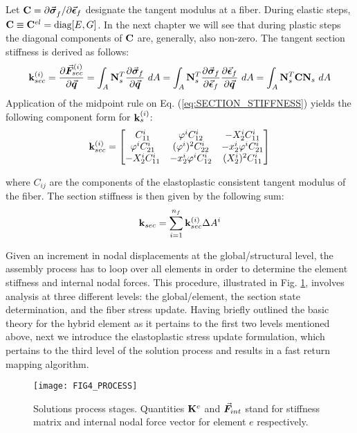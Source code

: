 Let $\mathbf{C}= \partial\vec{\boldsymbol{\sigma}}_f^{}/\partial\vec{\boldsymbol{\epsilon}}_f$ designate 
the tangent modulus at a fiber. During elastic steps,
$\mathbf{C}\equiv\mathbf{C}^{el} = \text{diag}[E,G]$. In the next chapter we will 
see that 
during plastic steps the
diagonal components of $\mathbf{C}$ are, generally, also non-zero. The tangent 
section stiffness is derived as follows:
\begin{equation}
	\bmat{k}^{(i)}_{sec} = \frac{\partial\bvec{F}_{sec}^{(i)} 
	}{\partial\bvec{q}} = 
	\int_A\bmat{N}_s^T\frac{\partial\bvec{\sigma}_f}{\partial\bvec{q}}\ dA=
	\int_A\bmat{N}_s^T\frac{\partial\bvec{\sigma}_f}{\partial\bvec{\epsilon}_f}
	\frac{\partial\bvec{\epsilon}_f}{\partial\bvec{q}}\
	dA = \int_A\bmat{N}_s^T\bmat{C}\bmat{N}_s\ dA
	\label{eq:SECTION_STIFFNESS}
\end{equation}
Application of the midpoint rule on Eq. (\ref{eq:SECTION_STIFFNESS}) yields the 
following component form for $\mathbf{k}^{(i)}_s$:
\begin{equation}
	\mathbf{k}^{(i)}_{sec} = \begin{bmatrix}
		C^i_{11}		& 		\varphi^iC^i_{12} & -X_2^iC^i_{11}\\
		\varphi^iC^i_{21}  &  (\varphi^i)^2C^i_{22}  &  
		-x_2^i\varphi^iC^i_{21}\\
		-X_2^iC^i_{11}  &  -x_2^i\varphi^iC^i_{12}   & (X_2^i)^2C^i_{11}
	\end{bmatrix}
	\label{eq:FIB_STIFF_CONTRIB}
\end{equation}

\noindent where $C_{ij}$ are the components of the elastoplastic consistent 
tangent modulus of the fiber. The section stiffness is then given by the 
following sum:
\begin{equation}
	\mathbf{k}_{sec} = \sum_{i=1}^{n_f}\mathbf{k}^{(i)}_{sec}\Delta A^i
	\label{eq:FIBER_CONTRIB_TO_STIFF}
\end{equation}

Given an increment in nodal displacements at the global/structural level, the
assembly process has to loop over all elements in order to determine the element
stiffness and internal nodal forces. This procedure, illustrated in
Fig. \ref{fig:FIG4_PROCESS}, involves analysis at three different levels: the 
global/element,
the section state determination, and the fiber stress update. Having briefly
outlined the basic theory for the hybrid element as it pertains to the first two
levels mentioned above, next we introduce the elastoplastic stress update 
formulation, which pertains to the third level of the solution process and
results in a fast return mapping algorithm.
\begin{figure}[t]
	\centering
	\texttt{[image: FIG4\_PROCESS]}
	\caption{Solutions process stages. Quantities $\mathbf{K}^e$ and
		$\vec{\boldsymbol{F}}_{int}$ stand for stiffness matrix and internal nodal force 
		vector
		for element $e$ respectively.}
	\label{fig:FIG4_PROCESS}
\end{figure}

